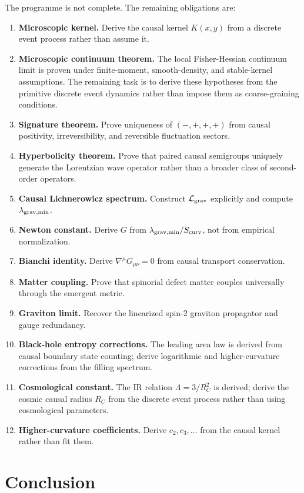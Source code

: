 \documentclass[11pt]{article}
\begin{document}
The programme is not complete. The remaining obligations are:
\begin{enumerate}
\item \textbf{Microscopic kernel.} Derive the causal kernel $K(x,y)$ from a discrete event process rather than assume it.
\item \textbf{Microscopic continuum theorem.} The local Fisher-Hessian continuum limit is proven under finite-moment, smooth-density, and stable-kernel assumptions. The remaining task is to derive these hypotheses from the primitive discrete event dynamics rather than impose them as coarse-graining conditions.
\item \textbf{Signature theorem.} Prove uniqueness of $(-,+,+,+)$ from causal positivity, irreversibility, and reversible fluctuation sectors.
\item \textbf{Hyperbolicity theorem.} Prove that paired causal semigroups uniquely generate the Lorentzian wave operator rather than a broader class of second-order operators.
\item \textbf{Causal Lichnerowicz spectrum.} Construct $\mathcal L_{\rm grav}$ explicitly and compute $\lambda_{\rm grav,min}$.
\item \textbf{Newton constant.} Derive $G$ from $\lambda_{\rm grav,min}/S_{\rm curv}$, not from empirical normalization.
\item \textbf{Bianchi identity.} Derive $\nabla^\mu G_{\mu\nu}=0$ from causal transport conservation.
\item \textbf{Matter coupling.} Prove that spinorial defect matter couples universally through the emergent metric.
\item \textbf{Graviton limit.} Recover the linearized spin-2 graviton propagator and gauge redundancy.
\item \textbf{Black-hole entropy corrections.} The leading area law is derived from causal boundary state counting; derive logarithmic and higher-curvature corrections from the filling spectrum.
\item \textbf{Cosmological constant.} The IR relation $\Lambda=3/R_C^2$ is derived; derive the cosmic causal radius $R_C$ from the discrete event process rather than using cosmological parameters.
\item \textbf{Higher-curvature coefficients.} Derive $c_2,c_3,\ldots$ from the causal kernel rather than fit them.
\end{enumerate}


\section{Conclusion}
\end{document}
